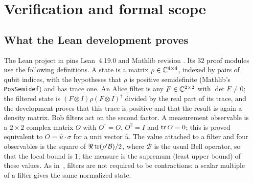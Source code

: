 \section{Verification and formal scope}
\label{sec:verification}

\subsection{What the Lean development proves}

The Lean project in  pins Lean~4.19.0 and Mathlib revision
. Its $32$ proof modules
use the following definitions. A state is a matrix
$\rho\in\mathbb C^{4\times4}$, indexed by pairs of qubit indices, with the
hypotheses that $\rho$ is positive semidefinite (Mathlib's
\texttt{PosSemidef}) and has trace one. An Alice filter is any
$F\in\mathbb C^{2\times2}$ with $\det F\ne0$; the filtered state is
$(F\otimes I)\rho(F\otimes I)^\dagger$ divided by the real part of its
trace, and the development proves that this trace is positive and that the
result is again a density matrix. Bob filters act on the second factor.
A measurement observable is a $2\times2$ complex matrix $O$ with
$O^\dagger=O$, $O^2=I$ and $\operatorname{tr} O=0$; this is proved equivalent to
$O=\hat u\cdot\sigma$ for a unit vector $\hat u$. The value attached to a
filter and four observables is the square of
$\Re\operatorname{tr}(\rho'\mathcal B)/2$, where $\mathcal B$ is the usual Bell operator,
so that the local bound is $1$; the measure is the supremum (least upper
bound) of these values. As in~\cite{ducuara}, filters are not required to
be contractions: a scalar multiple of a filter gives the same normalized
state.

